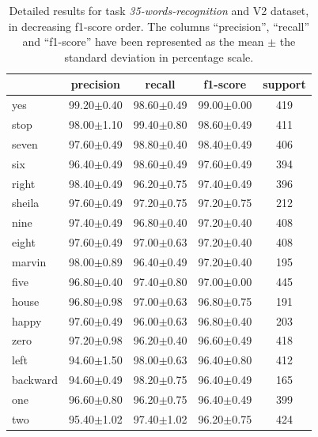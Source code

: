 \begin{table}[h!] \centering \scriptsize
	\caption[Speech commands precision-recall for \textit{35-words-recognition} task]{Detailed results for task \textit{35-words-recognition} and V2 dataset, in decreasing f1-score order. The columns ``precision'', ``recall'' and ``f1-score'' have been represented as the mean $\pm$ the standard deviation in percentage scale. } \label{tab:kwsperclassresults35}
	\begin{tabular}{lcccc}
		\toprule
		{} &       precision &          recall &        f1-score & support \\
		\midrule
		yes       &  99.20$\pm$0.40 &  98.60$\pm$0.49 &  99.00$\pm$0.00 &     419 \\
		stop      &  98.00$\pm$1.10 &  99.40$\pm$0.80 &  98.60$\pm$0.49 &     411 \\
		seven     &  97.60$\pm$0.49 &  98.80$\pm$0.40 &  98.40$\pm$0.49 &     406 \\
		six       &  96.40$\pm$0.49 &  98.60$\pm$0.49 &  97.60$\pm$0.49 &     394 \\
		right     &  98.40$\pm$0.49 &  96.20$\pm$0.75 &  97.40$\pm$0.49 &     396 \\
		sheila    &  97.60$\pm$0.49 &  97.20$\pm$0.75 &  97.20$\pm$0.75 &     212 \\
		nine      &  97.40$\pm$0.49 &  96.80$\pm$0.40 &  97.20$\pm$0.40 &     408 \\
		eight     &  97.60$\pm$0.49 &  97.00$\pm$0.63 &  97.20$\pm$0.40 &     408 \\
		marvin    &  98.00$\pm$0.89 &  96.40$\pm$0.49 &  97.20$\pm$0.40 &     195 \\
		five      &  96.80$\pm$0.40 &  97.40$\pm$0.80 &  97.00$\pm$0.00 &     445 \\
		house     &  96.80$\pm$0.98 &  97.00$\pm$0.63 &  96.80$\pm$0.75 &     191 \\
		happy     &  97.60$\pm$0.49 &  96.00$\pm$0.63 &  96.80$\pm$0.40 &     203 \\
		zero      &  97.20$\pm$0.98 &  96.20$\pm$0.40 &  96.60$\pm$0.49 &     418 \\
		left      &  94.60$\pm$1.50 &  98.00$\pm$0.63 &  96.40$\pm$0.80 &     412 \\
		backward  &  94.60$\pm$0.49 &  98.20$\pm$0.75 &  96.40$\pm$0.49 &     165 \\
		one       &  96.60$\pm$0.80 &  96.20$\pm$0.75 &  96.40$\pm$0.49 &     399 \\
		two       &  95.40$\pm$1.02 &  97.40$\pm$1.02 &  96.20$\pm$0.75 &     424 \\

\end{tabular}
\end{table}
